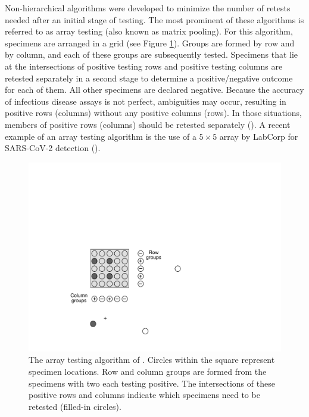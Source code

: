 Non-hierarchical algorithms were developed to minimize the number
of retests needed after an initial stage of testing. The most prominent
of these algorithms is referred to as array testing (also known as
matrix pooling). For this algorithm, specimens are arranged in a grid
(see Figure \ref{fig:array-1-1}). Groups are formed by row and by
column, and each of these groups are subsequently tested. Specimens 
that lie at the intersections of positive testing rows and
positive testing columns are retested separately in a second stage
to determine a positive/negative outcome for each of them. All other
specimens are declared negative. Because the accuracy of infectious
disease assays is not perfect, ambiguities may occur, resulting in
positive rows (columns) without any positive columns (rows). In those
situations, members of positive rows (columns) should be retested
separately (\citealt{Kim2007}). A recent example of an array testing
algorithm is the use of a $5\times5$ array by LabCorp for SARS-CoV-2
detection (\citealt{LabCorp}).

\begin{figure}
\begin{centering}
\includegraphics[scale=0.7]{figures/images_array5x5BW.pdf}
\par\end{centering}
\caption{\label{fig:array-1-1}The array testing algorithm of \citet{LabCorp}.
Circles within the square represent specimen locations. Row and column
groups are formed from the specimens with two each testing positive.
The intersections of these positive rows and columns indicate which
specimens need to be retested (filled-in circles). }
\end{figure}

